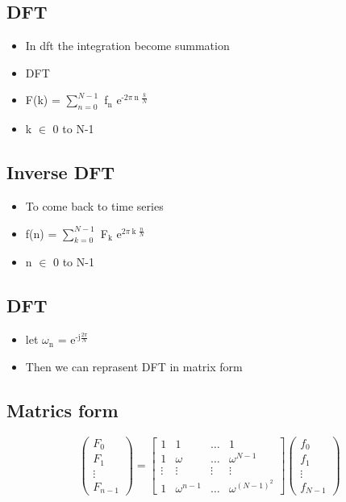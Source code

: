 \documentclass[11pt]{article}
\begin{document}
\subsection{DFT}
\label{sec:orgfbea701}
\begin{itemize}
\item In dft the integration become summation
\item DFT
\item F(k) = \(\sum_{n=0}^{N-1}\) f\(_{\text{n}}\) e\(^{\text{-2}\pi\ \text{n }\frac{k}{N}}\)
\item k \(\in\) 0 to N-1
\end{itemize}
\subsection{Inverse DFT}
\label{sec:org5dc4842}
\begin{itemize}
\item To come back to time series
\item f(n) = \(\sum_{k=0}^{N-1}\) F\(_{\text{k}}\) e\(^{\text{2}\pi\ \text{k }\frac{n}{N}}\)
\item n \(\in\) 0 to N-1
\end{itemize}
\subsection{DFT}
\label{sec:org084b162}
\begin{itemize}
\item let \(\omega_{\text{n}}\) = e\(^{\text{-j}\frac{2\pi}{N}}\)
\item Then we can reprasent DFT in matrix form
\end{itemize}
\subsection{Matrics form}
\label{sec:orgfcf4720}
\[ \begin{pmatrix} F_0\\F_1\\ \vdots \\F_{n-1} \end{pmatrix} = \begin{bmatrix}
1 & 1 & \ldots & 1 \\
1 & \omega & \ldots & \omega^{N-1} \\
\vdots & \vdots & \vdots & \vdots \\
1 & \omega^{n-1} & \ldots & \omega^{(N-1)^2} 
\end{bmatrix} \begin{pmatrix} f_0 \\ f_1 \\ \vdots \\ f_{N-1} \end{pmatrix} \]
\end{document}
